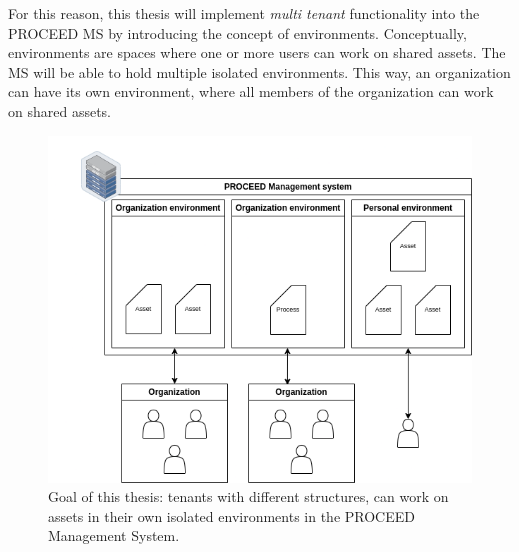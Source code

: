 For this reason, this thesis will implement \textit{multi tenant} functionality into the PROCEED MS by introducing the concept of environments.
Conceptually, environments are spaces where one or more users can work on shared assets.
The MS will be able to hold multiple isolated environments.
This way, an organization can have its own environment, where all members of the
organization can work on shared assets.


\begin{figure}[H]
	\centering
	\includegraphics[scale=0.45]{images/proceed-workspaces-v2.drawio.png}
	\caption{Goal of this thesis: tenants with different structures, can work on assets in their own isolated environments in
		the PROCEED Management System.}
	\label{fig:proceed-envitonments-overview}
\end{figure}

